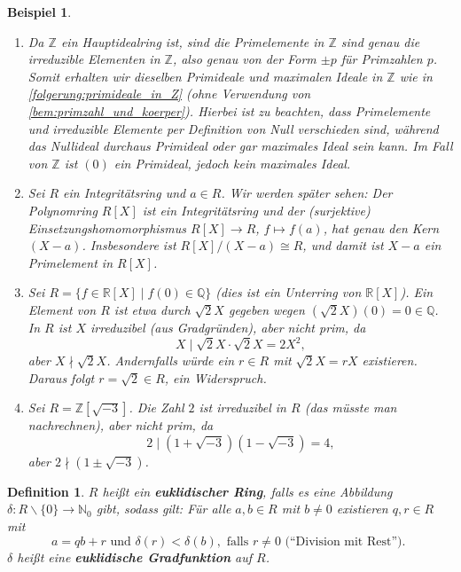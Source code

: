 \documentclass[a4paper, twoside, 11pt, ngerman]{report}
\newcommand{\NN}{\mathds N}
\newcommand{\QQ}{\mathds Q}
\newcommand{\RR}{\mathds R}
\newcommand{\ZZ}{\mathds Z}
\renewcommand{\setminus}{\smallsetminus}
\theoremstyle{definistyle}
\newtheorem{defini}[satz]{Definition}
\newtheorem{bsp}[satz]{Beispiel}
\theoremstyle{remark}
\newcommand{\defn}[1]{\textit{\bfseries #1}}
\begin{document}
\begin{bsp}\label{bsp:primelement_beispiele}
\begin{enumerate}[label=(\alph*)]
    \item Da $\ZZ$ ein Hauptidealring ist, sind die Primelemente in $\ZZ$ sind genau die irreduzible Elementen in $\ZZ$, also genau von der Form $\pm p$ für Primzahlen $p$. Somit erhalten wir dieselben Primideale und maximalen Ideale in $\ZZ$ wie in \ref{folgerung:primideale_in_Z} (ohne Verwendung von \ref{bem:primzahl_und_koerper}).
    Hierbei ist zu beachten, dass Primelemente und irreduzible Elemente per Definition von Null
    verschieden sind, während das Nullideal durchaus Primideal oder gar maximales Ideal sein kann.
    Im Fall von $\ZZ$ ist $(0)$ ein Primideal, jedoch kein maximales Ideal.
    \item Sei $R$ ein Integritätsring und $a \in R$. Wir werden später sehen: Der Polynomring $R[X]$ ist ein Integritätsring und der (surjektive) Einsetzungshomomorphismus $R[X] \to R$, $f \mapsto f(a)$, hat genau den Kern $(X - a)$. Insbesondere ist $R[X] / (X - a) \cong R$, und damit ist $X - a$ ein Primelement in $R[X]$.
    \item Sei $R = \{f \in \RR[X] \mid f(0) \in \QQ \}$ (dies ist ein Unterring von $\RR[X]$). 
    Ein Element von $R$ ist etwa durch $\sqrt{2} X$ gegeben wegen $(\sqrt{2} X)(0) = 0 \in \QQ$.
    In $R$ ist $X$ irreduzibel (aus Gradgründen), aber nicht prim, da \[X \mid \sqrt{2} X \cdot \sqrt{2} X = 2 X^2,\] aber $X \nmid \sqrt{2} X$.
    Andernfalls würde ein $r \in R$ mit $\sqrt{2} X = r X$ existieren. Daraus folgt $r = \sqrt{2} \in R$, ein Widerspruch.   
    \item Sei $R = \ZZ[\sqrt{-3}]$. 
    Die Zahl $2$ ist irreduzibel in $R$ (das müsste man nachrechnen), aber nicht prim, da 
    \[
    2 \mid (1 + \sqrt{-3})(1 - \sqrt{-3}) = 4,\]
    aber $2 \nmid (1 \pm \sqrt{-3})$.
\end{enumerate}
\end{bsp}

\begin{defini}\label{def:euklidischer_ring}
$R$ heißt ein \defn{euklidischer Ring}, falls es eine Abbildung $\delta \colon R \setminus \{0\} \to \NN_0$ gibt, sodass gilt:
Für alle $a, b \in R$ mit $b \neq 0$ existieren $q, r \in R$ mit \[a = q b + r \text{ und } \delta(r) < \delta(b), \text{ falls } r \neq 0 \text{ (``Division mit Rest''). }\]
$\delta$ heißt eine \defn{euklidische Gradfunktion} auf $R$.
\end{defini}
\end{document}
